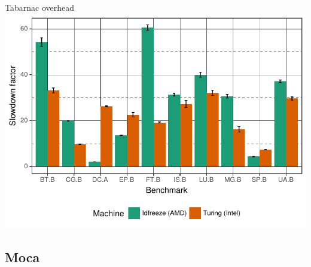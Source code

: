 \documentclass[xcolor={usenames,dvipsnames},hyperref={pdfusetitle}]{beamer}
\begin{document}
\setcounter{framenumber}{\value{finalframe}}
\begin{frame}{Tabarnac overhead}
    \includegraphics[width=\linewidth]{tabarnac/slides/tool-ovh.pdf}
\end{frame}

\subsection*{Moca}
\end{document}
